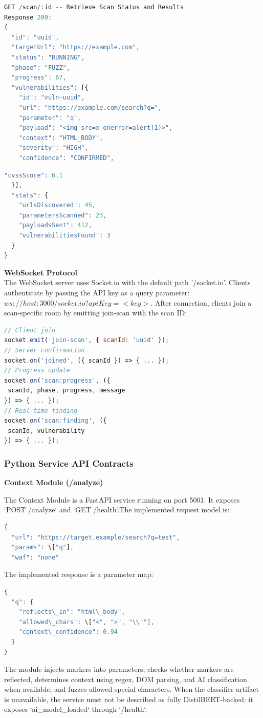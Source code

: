 \begin{lstlisting}[language=JavaScript, showstringspaces=false]
GET /scan/:id -- Retrieve Scan Status and Results
Response 200:
{
  "id": "uuid",
  "targetUrl": "https://example.com",
  "status": "RUNNING",
  "phase": "FUZZ",
  "progress": 67,
  "vulnerabilities": [{
    "id": "vuln-uuid",
    "url": "https://example.com/search?q=",
    "parameter": "q",
    "payload": "<img src=x onerror=alert(1)>",
    "context": "HTML_BODY",
    "severity": "HIGH",
    "confidence": "CONFIRMED",
     \end{lstlisting}
      \begin{lstlisting}[language=JavaScript, showstringspaces=false]
    "cvssScore": 6.1
  }],
  "stats": {
    "urlsDiscovered": 45,
    "parametersScanned": 23,
    "payloadsSent": 412,
    "vulnerabilitiesFound": 3
  }
}
\end{lstlisting}

\textbf{WebSocket Protocol}
\\
The WebSocket server uses Socket.io with the default path '/socket.io'. Clients authenticate by passing the API key as a query parameter: $ws://host:3000/socket.io?apiKey=<key>$. After connection, clients join a scan-specific room by emitting join-scan with the scan ID:
\begin{lstlisting}[language=JavaScript, showstringspaces=false]
// Client join
socket.emit('join-scan', { scanId: 'uuid' });
// Server confirmation
socket.on('joined', ({ scanId }) => { ... });
// Progress update
socket.on('scan:progress', ({
 scanId, phase, progress, message
}) => { ... });
// Real-time finding
socket.on('scan:finding', ({
 scanId, vulnerability
}) => { ... });
\end{lstlisting}
\subsubsection{Python Service API Contracts}
\textbf{Context Module (/analyze)}

The Context Module is a FastAPI service running on port 5001. It exposes `POST /analyze` and `GET /health`.The implemented request model is:

\begin{lstlisting}[language=JavaScript]
{
  "url": "https://target.example/search?q=test",
  "params": \["q"],
  "waf": "none"
\end{lstlisting}
The implemented response is a parameter map:
\begin{lstlisting}[language=JavaScript]
{
  "q": {
    "reflects\_in": "html\_body",
    "allowed\_chars": \["<", ">", "\\""],
    "context\_confidence": 0.94
  }
}
\end{lstlisting}
The module injects markers into parameters, checks whether markers are reflected, determines context using regex, DOM parsing, and AI classification when available, and fuzzes allowed special characters. When the classifier artifact is unavailable, the service must not be described as fully DistilBERT-backed; it exposes `ai\_model\_loaded` through `/health`.

